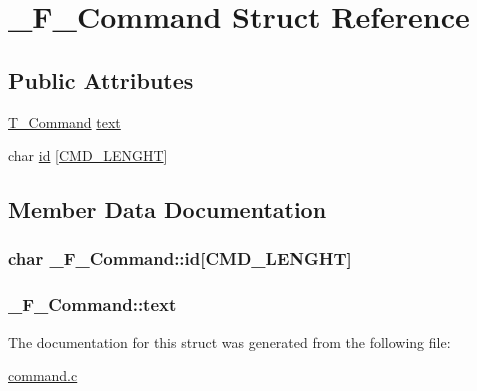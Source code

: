 \hypertarget{struct__F__Command}{}\section{\+\_\+\+F\+\_\+\+Command Struct Reference}
\label{struct__F__Command}
\subsection*{Public Attributes}
\begin{DoxyCompactItemize}
\item 
\hyperlink{command_8h_a0473597db8c45c0289b6b8e2f8abbe32}{T\+\_\+\+Command} \hyperlink{struct__F__Command_a6a2c6e6db16dad0da7732cea69c07559}{text}
\item 
char \hyperlink{struct__F__Command_a138723d3b8278597200ae2ff43d8ef74}{id} \mbox{[}\hyperlink{command_8c_a2b1bd24d2eddf8081d8c541e4cc4fd4b}{C\+M\+D\+\_\+\+L\+E\+N\+G\+HT}\mbox{]}
\end{DoxyCompactItemize}


\subsection{Member Data Documentation}
\subsubsection[{\texorpdfstring{id}{id}}]{\setlength{\rightskip}{0pt plus 5cm}char \+\_\+\+F\+\_\+\+Command\+::id\mbox{[}{\bf C\+M\+D\+\_\+\+L\+E\+N\+G\+HT}\mbox{]}}\hypertarget{struct__F__Command_a138723d3b8278597200ae2ff43d8ef74}{}\label{struct__F__Command_a138723d3b8278597200ae2ff43d8ef74}
\subsubsection[{\texorpdfstring{text}{text}}]{ \+\_\+\+F\+\_\+\+Command\+::text}\hypertarget{struct__F__Command_a6a2c6e6db16dad0da7732cea69c07559}{}\label{struct__F__Command_a6a2c6e6db16dad0da7732cea69c07559}


The documentation for this struct was generated from the following file\+:\begin{DoxyCompactItemize}
\item 
\hyperlink{command_8c}{command.\+c}\end{DoxyCompactItemize}

